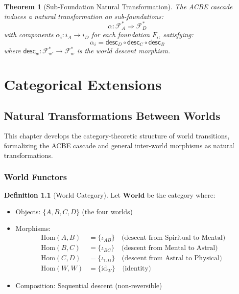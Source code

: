 \documentclass[11pt,twoside,openright]{book}
\theoremstyle{definition}
\newtheorem{definition}{Definition}[chapter]
\theoremstyle{plain}
\newtheorem{theorem}[definition]{Theorem}
\theoremstyle{remark}
\newcommand{\Foundations}{\mathcal{F}}
\newcommand{\vnewone}{\textbf{v7.1 New}}
\begin{document}
\begin{theorem}[Sub-Foundation Natural Transformation]
\label{thm:subfoundation-nat-trans}
The ACBE cascade induces a natural transformation on sub-foundations:
\[
\alpha : \Foundations^*_A \Rightarrow \Foundations^*_D
\]
with components $\alpha_i : i_A \to i_D$ for each foundation $F_i$, satisfying:
\[
\alpha_i = \mathsf{desc}_D \circ \mathsf{desc}_C \circ \mathsf{desc}_B
\]
where $\mathsf{desc}_w : \Foundations^*_{w'} \to \Foundations^*_w$ is the world descent morphism.
\end{theorem}

\part{Categorical Extensions}

\chapter{Natural Transformations Between Worlds}
\label{ch:nat-trans}

\begin{tcolorbox}[colback=blue!5!white,colframe=blue!75!black,title=\vnewone]
This chapter develops the category-theoretic structure of world transitions, formalizing the ACBE cascade and general inter-world morphisms as natural transformations.
\end{tcolorbox}

\section{World Functors}

\begin{definition}[World Category]
\label{def:world-cat}
Let $\mathbf{World}$ be the category where:
\begin{itemize}
  \item Objects: $\{A, B, C, D\}$ (the four worlds)
  \item Morphisms:
  \begin{align}
    \mathrm{Hom}(A, B) &= \{\iota_{AB}\} \quad \text{(descent from Spiritual to Mental)} \\
    \mathrm{Hom}(B, C) &= \{\iota_{BC}\} \quad \text{(descent from Mental to Astral)} \\
    \mathrm{Hom}(C, D) &= \{\iota_{CD}\} \quad \text{(descent from Astral to Physical)} \\
    \mathrm{Hom}(W, W) &= \{\mathrm{id}_W\} \quad \text{(identity)}
  \end{align}
  \item Composition: Sequential descent (non-reversible)
\end{itemize}
\end{definition}
\end{document}
